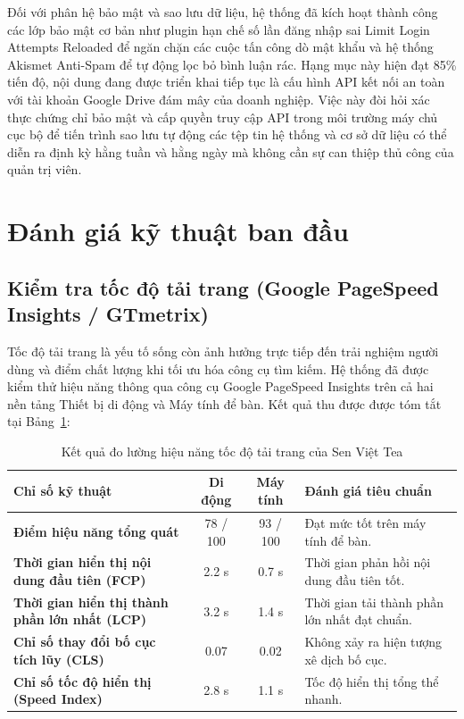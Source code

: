 Đối với phân hệ bảo mật và sao lưu dữ liệu, hệ thống đã kích hoạt thành công các lớp bảo mật cơ bản như plugin hạn chế số lần đăng nhập sai Limit Login Attempts Reloaded \cite{plugin_limit_login} để ngăn chặn các cuộc tấn công dò mật khẩu và hệ thống Akismet Anti-Spam \cite{plugin_akismet} để tự động lọc bỏ bình luận rác. Hạng mục này hiện đạt 85\% tiến độ, nội dung đang được triển khai tiếp tục là cấu hình API kết nối an toàn với tài khoản Google Drive đám mây của doanh nghiệp. Việc này đòi hỏi xác thực chứng chỉ bảo mật và cấp quyền truy cập API trong môi trường máy chủ cục bộ để tiến trình sao lưu tự động các tệp tin hệ thống và cơ sở dữ liệu có thể diễn ra định kỳ hằng tuần và hằng ngày mà không cần sự can thiệp thủ công của quản trị viên.


\section{Đánh giá kỹ thuật ban đầu}

\subsection{Kiểm tra tốc độ tải trang (Google PageSpeed Insights / GTmetrix)}

Tốc độ tải trang là yếu tố sống còn ảnh hưởng trực tiếp đến trải nghiệm người dùng và điểm chất lượng khi tối ưu hóa công cụ tìm kiếm. Hệ thống đã được kiểm thử hiệu năng thông qua công cụ Google PageSpeed Insights \cite{google_web_vitals} trên cả hai nền tảng Thiết bị di động và Máy tính để bàn. Kết quả thu được được tóm tắt tại Bảng~\ref{tab:pagespeed}:

\begin{table}[H]
    \centering
    \caption{Kết quả đo lường hiệu năng tốc độ tải trang của Sen Việt Tea}
    \label{tab:pagespeed}
    \begin{tabular}{p{5.5cm} c c p{4cm}}
        \toprule
        \textbf{Chỉ số kỹ thuật} & \textbf{Di động} & \textbf{Máy tính} & \textbf{Đánh giá tiêu chuẩn} \\
        \midrule
        \textbf{Điểm hiệu năng tổng quát} & 78 / 100 & 93 / 100 & Đạt mức tốt trên máy tính để bàn. \\
        \textbf{Thời gian hiển thị nội dung đầu tiên (FCP)} & 2.2 s & 0.7 s & Thời gian phản hồi nội dung đầu tiên tốt. \\
        \textbf{Thời gian hiển thị thành phần lớn nhất (LCP)} & 3.2 s & 1.4 s & Thời gian tải thành phần lớn nhất đạt chuẩn. \\
        \textbf{Chỉ số thay đổi bố cục tích lũy (CLS)} & 0.07 & 0.02 & Không xảy ra hiện tượng xê dịch bố cục. \\
        \textbf{Chỉ số tốc độ hiển thị (Speed Index)} & 2.8 s & 1.1 s & Tốc độ hiển thị tổng thể nhanh. \\
        \bottomrule
    \end{tabular}
\end{table}

